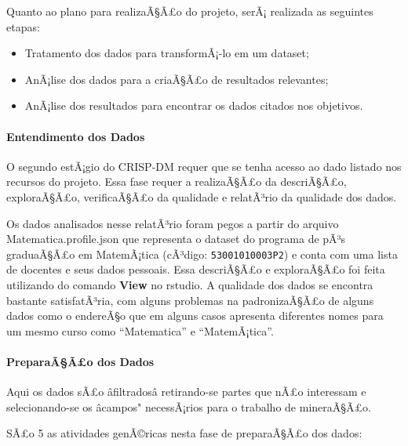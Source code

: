 \documentclass[]{article}
\providecommand{\tightlist}{%
  \setlength{\itemsep}{0pt}\setlength{\parskip}{0pt}}
\let\oldparagraph\paragraph
\renewcommand{\paragraph}[1]{\oldparagraph{#1}\mbox{}}
\begin{document}
Quanto ao plano para realizaÃ§Ã£o do projeto, serÃ¡ realizada as
seguintes etapas:

\begin{itemize}
\tightlist
\item
  Tratamento dos dados para transformÃ¡-lo em um dataset;
\item
  AnÃ¡lise dos dados para a criaÃ§Ã£o de resultados relevantes;
\item
  AnÃ¡lise dos resultados para encontrar os dados citados nos objetivos.
\end{itemize}

\paragraph{\texorpdfstring{\textbf{Entendimento dos
Dados}}{Entendimento dos Dados}}\label{entendimento-dos-dados}

O segundo estÃ¡gio do CRISP-DM requer que se tenha acesso ao dado
listado nos recursos do projeto. Essa fase requer a realizaÃ§Ã£o da
descriÃ§Ã£o, exploraÃ§Ã£o, verificaÃ§Ã£o da qualidade e relatÃ³rio da
qualidade dos dados.

Os dados analisados nesse relatÃ³rio foram pegos a partir do arquivo
Matematica.profile.json que representa o dataset do programa de pÃ³s
graduaÃ§Ã£o em MatemÃ¡tica (cÃ³digo: \texttt{53001010003P2}) e conta com
uma lista de docentes e seus dados pessoais. Essa descriÃ§Ã£o e
exploraÃ§Ã£o foi feita utilizando do comando \textbf{View} no rstudio. A
qualidade dos dados se encontra bastante satisfatÃ³ria, com alguns
problemas na padronizaÃ§Ã£o de alguns dados como o endereÃ§o que em
alguns casos apresenta diferentes nomes para um mesmo curso como
``Matematica'' e ``MatemÃ¡tica''.

\paragraph{\texorpdfstring{\textbf{PreparaÃ§Ã£o dos
Dados}}{PreparaÃ§Ã£o dos Dados}}\label{preparaaao-dos-dados}

Aqui os dados sÃ£o âfiltradosâ retirando-se partes que nÃ£o
interessam e selecionando-se os âcampos" necessÃ¡rios para o trabalho
de mineraÃ§Ã£o.

SÃ£o 5 as atividades genÃ©ricas nesta fase de preparaÃ§Ã£o dos dados:
\end{document}
